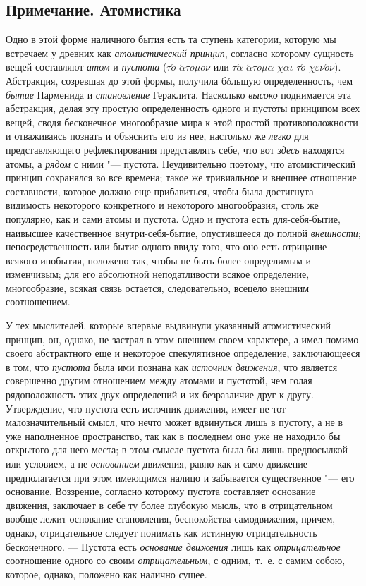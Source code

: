 \subsection*{Примечание. Атомистика}

Одно в этой форме наличного бытия есть та ступень категории, которую мы
встречаем у древних как {\em атомистический принцип},
согласно которому сущность вещей составляют {\em атом}
и {\em пустота} ($\tau \acute{o}$
$\acute{\alpha} \tau o \mu o \nu $ или $\tau \acute{\alpha}$
$\acute{\alpha} \tau o \mu \alpha $ $\chi \alpha \iota $
$\tau \acute{o}$ $\chi \varepsilon \nu \acute{o} \nu $).
Абстракция, созревшая до этой формы, получила бóльшую определенность, чем
{\em бытие} Парменида и
{\em становление} Гераклита. Насколько
{\em высоко} поднимается эта абстракция, делая эту
простую определенность одного и пустоты принципом всех вещей, сводя
бесконечное многообразие мира к этой простой противоположности и
отваживаясь познать и объяснить его из нее, настолько же
{\em легко} для представляющего рефлектирования
представлять себе, что вот {\em здесь} находятся атомы,
а {\em рядом} с ними "--- пустота. Неудивительно поэтому,
что атомистический принцип сохранялся во все времена; такое же тривиальное
и внешнее отношение составности, которое должно еще прибавиться, чтобы была
достигнута видимость некоторого конкретного и некоторого многообразия,
столь же популярно, как и сами атомы и пустота. Одно и пустота есть
для-себя-бытие, наивысшее качественное внутри-себя-бытие, опустившееся до
полной {\em внешности}; непосредственность или бытие
одного ввиду того, что оно есть отрицание всякого инобытия, положено так,
чтобы не быть более определимым и изменчивым; для его абсолютной
неподатливости всякое определение, многообразие, всякая связь остается,
следовательно, всецело внешним соотношением.

У тех мыслителей, которые впервые выдвинули указанный атомистический
принцип, он, однако, не застрял в этом внешнем своем характере, а имел
помимо своего абстрактного еще и некоторое спекулятивное определение,
заключающееся в том, что {\em пустота} была ими познана
как {\em источник движения}, что является совершенно
другим отношением между атомами и пустотой, чем голая рядоположность этих
двух определений и их безразличие друг к другу. Утверждение, что пустота
есть источник движения, имеет не тот малозначительный смысл, что нечто
может вдвинуться лишь в пустоту, а не в уже наполненное пространство, так
как в последнем оно уже не находило бы открытого для него места; в этом
смысле пустота была бы лишь предпосылкой или условием, а не
{\em основанием} движения, равно как и само движение
предполагается при этом имеющимся налицо и забывается существенное "--- его
основание. Воззрение, согласно которому пустота составляет основание
движения, заключает в себе ту более глубокую мысль, что в отрицательном
вообще лежит основание становления, беспокойства самодвижения, причем,
однако, отрицательное следует понимать как истинную отрицательность
бесконечного. — Пустота есть {\em основание движения}
лишь как {\em отрицательное} соотношение одного со
своим {\em отрицательным}, с одним,~т.~е. с самим
собою, которое, однако, положено как налично сущее.

